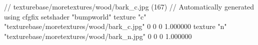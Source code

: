 // texturebase/moretextures/wood/bark_c.jpg (167)
// Automatically generated using cfgfix
setshader "bumpworld"
texture "c" "texturebase/moretextures/wood/bark_c.jpg" 0 0 0 1.000000
texture "n" "texturebase/moretextures/wood/bark_n.jpg" 0 0 0 1.000000
